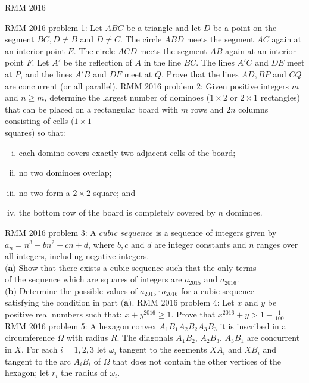 RMM 2016 

RMM 2016 problem 1:  Let $ABC$ be a triangle and let $D$ be a point on the segment $BC, D\neq B$ and $D\neq C$. The circle $ABD$ meets the segment $AC$ again at an interior point $E$. The circle $ACD$ meets the segment $AB$ again at an interior point $F$. Let $A'$ be the reflection of $A$ in the line $BC$. The lines $A'C$ and $DE$ meet at $P$, and the lines $A'B$ and $DF$ meet at $Q$. Prove that the lines $AD, BP$ and $CQ$ are concurrent (or all parallel). 
RMM 2016 problem 2:  Given positive integers $m$ and $n \ge m$, determine the largest number of dominoes ($1\times2$ or $2 \times 1$ rectangles) that can be placed on a rectangular board with $m$ rows and $2n$ columns consisting of cells ($1 \times 1$ \\
squares) so that:
\begin{enumerate}[(i)]
  \item each domino covers exactly two adjacent cells of the board;
  \item no two dominoes overlap;
  \item no two form a $2 \times 2$ square; and
  \item the bottom row of the board is completely covered by $n$ dominoes.
\end{enumerate} 
RMM 2016 problem 3:  A $\textit{cubic sequence}$ is a sequence of integers given by $a_n =n^3 + bn^2 + cn + d$, where $b, c$ and $d$ are integer constants and $n$ ranges over all integers, including negative integers. \\
$\textbf{(a)}$ Show that there exists a cubic sequence such that the only terms \\
of the sequence which are squares of integers are $a_{2015}$ and $a_{2016}$. \\
$\textbf{(b)}$ Determine the possible values of $a_{2015} \cdot a_{2016}$ for a cubic sequence \\
satisfying the condition in part $\textbf{(a)}$. 
RMM 2016 problem 4:  Let $x$ and $y$ be positive real numbers such that: $x+y^{2016}\geq 1$. Prove that $x^{2016}+y> 1-\frac{1}{100}$ 
RMM 2016 problem 5:  A hexagon convex $A_1B_1A_2B_2A_3B_3$ it is inscribed in a circumference $\Omega$ with radius $R$. The diagonals $A_1B_2$, $A_2B_3$, $A_3B_1$ are concurrent in $X$. For each $i=1,2,3$ let $\omega_i$ tangent to the segments $XA_i$ and $XB_i$ and tangent to the arc $A_iB_i$ of $\Omega$ that does not contain the other vertices of the hexagon; let $r_i$ the radius of $\omega_i$. \\\\
